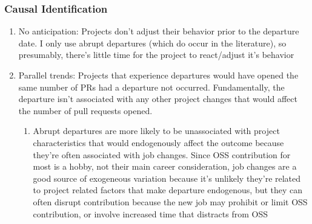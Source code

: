 \documentclass[12pt,notitlepage]{article}
\begin{document}
\subsubsection{Causal Identification}
\begin{enumerate}
    \item No anticipation: Projects don't adjust their behavior prior to the departure date. I only use abrupt departures (which do occur in the literature), so presumably, there's little time for the project to react/adjust it's behavior
    \item Parallel trends: Projects that experience departures would have opened the same number of PRs had a departure not occurred. Fundamentally, the departure isn't associated with any other project changes that would affect the number of pull requests opened.
    \begin{enumerate}
        \item Abrupt departures are more likely to be unassociated with project characteristics that would endogenously affect the outcome because they're often associated with job changes. Since OSS contribution for most is a hobby, not their main career consideration, job changes are a good source of exogeneous variation because it's unlikely they're related to project related factors that make departure endogenous, but they can often disrupt contribution because the new job may prohibit or limit OSS contribution, or involve increased time that distracts from OSS 
    \end{enumerate}
\end{enumerate}
\end{document}
